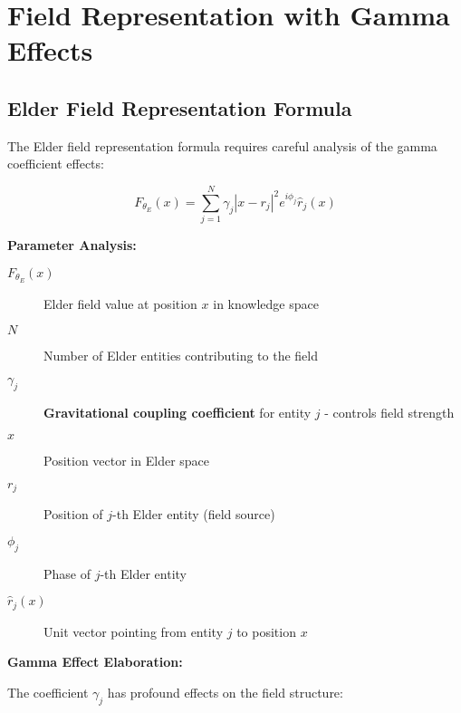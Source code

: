 \section{Field Representation with Gamma Effects}

\subsection{Elder Field Representation Formula}

The Elder field representation formula requires careful analysis of the gamma coefficient effects:

\begin{equation}
F_{\theta_E}(x) = \sum_{j=1}^{N} \gamma_j |x - r_j|^2 e^{i\phi_j} \hat{r}_j(x)
\end{equation}

\textbf{Parameter Analysis:}

\begin{description}
    \item[$F_{\theta_E}(x)$] Elder field value at position $x$ in knowledge space
    \item[$N$] Number of Elder entities contributing to the field
    \item[$\gamma_j$] \textbf{Gravitational coupling coefficient} for entity $j$ - controls field strength
    \item[$x$] Position vector in Elder space
    \item[$r_j$] Position of $j$-th Elder entity (field source)
    \item[$\phi_j$] Phase of $j$-th Elder entity
    \item[$\hat{r}_j(x)$] Unit vector pointing from entity $j$ to position $x$
\end{description}

\textbf{Gamma Effect Elaboration:}

The coefficient $\gamma_j$ has profound effects on the field structure:

